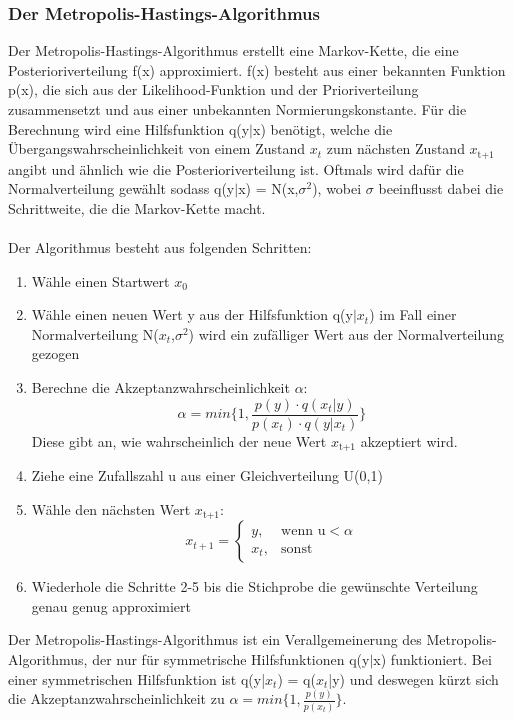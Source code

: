 \documentclass[a4paper,12pt]{article}
\begin{document}
\subsubsection{Der Metropolis-Hastings-Algorithmus}
Der Metropolis-Hastings-Algorithmus erstellt eine Markov-Kette, die eine Posterioriverteilung f(x) approximiert. f(x) besteht aus einer bekannten Funktion p(x), die sich aus der Likelihood-Funktion und der Prioriverteilung zusammensetzt und aus einer unbekannten Normierungskonstante. Für die Berechnung wird eine Hilfsfunktion q(y$|$x) benötigt, welche die Übergangswahrscheinlichkeit von einem Zustand $x_t$ zum nächsten Zustand $x_{\text{t+1}}$ angibt und ähnlich wie die Posterioriverteilung ist. Oftmals wird dafür die Normalverteilung gewählt sodass q(y$|$x) = N(x,$\sigma^2$), wobei $\sigma$ beeinflusst dabei die Schrittweite, die die Markov-Kette macht. \parencite[226f.]{HandbookMonteCarloMethods} \\\\ 
Der Algorithmus besteht aus folgenden Schritten:
\begin{enumerate}
  \item Wähle einen Startwert $x_0$
  \item Wähle einen neuen Wert y aus der Hilfsfunktion q(y$|x_t$) im Fall einer Normalverteilung N($x_t$,$\sigma^2$) wird ein zufälliger Wert aus der Normalverteilung gezogen
  \item Berechne die Akzeptanzwahrscheinlichkeit $\alpha$:
  \begin{equation}
    \alpha = min{\{1,\frac{p(y) \cdot q(x_t|y)}{p(x_t) \cdot q(y|x_t)}\}}
  \end{equation}
  Diese gibt an, wie wahrscheinlich der neue Wert $x_{\text{t+1}}$ akzeptiert wird.
  \item Ziehe eine Zufallszahl u aus einer Gleichverteilung U(0,1)
  \item Wähle den nächsten Wert $x_{\text{t+1}}$:
  \begin{equation}
    x_{t+1} = 
    \begin{cases}
      y, & \text{wenn u}< \alpha \\
      x_t, & \text{sonst}
    \end{cases}
  \end{equation}
  \item Wiederhole die Schritte 2-5 bis die Stichprobe die gewünschte Verteilung genau genug approximiert
\end{enumerate}
Der Metropolis-Hastings-Algorithmus ist ein Verallgemeinerung des Metropolis-Algorithmus, der nur für symmetrische Hilfsfunktionen q(y$|$x) funktioniert. Bei einer symmetrischen Hilfsfunktion ist q(y|$x_t$) = q($x_t$|y) und deswegen kürzt sich die Akzeptanzwahrscheinlichkeit zu $\alpha = min{\{1,\frac{p(y)}{p(x_t)}\}}$. \parencite[226f.]{HandbookMonteCarloMethods} \\\\
\end{document}
